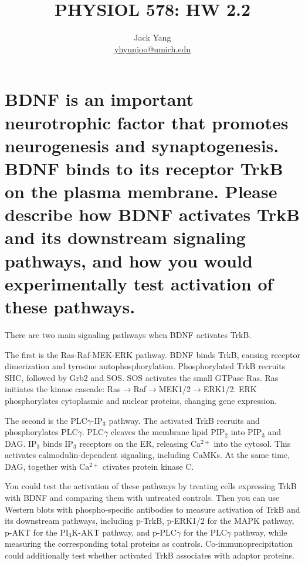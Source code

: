 \documentclass{article}
\title{PHYSIOL 578: HW 2.2\footnotetext{U-M GPT was used to help draft and refine the answers.}}
\author{Jack Yang \\ \href{mailto:yhyunjoo@umich.edu}{yhyunjoo@umich.edu}}
\begin{document}
\maketitle

\section{
    BDNF is an important neurotrophic factor that promotes neurogenesis and synaptogenesis.
    BDNF binds to its receptor TrkB on the plasma membrane.
    Please describe how BDNF activates TrkB and its downstream signaling pathways, and how you would experimentally test activation of these pathways.
}
There are two main signaling pathways when BDNF activates TrkB.

The first is the Ras-Raf-MEK-ERK pathway.
BDNF binds TrkB, causing receptor dimerization and tyrosine autophosphorylation.
Phosphorylated TrkB recruits SHC, followed by Grb2 and SOS.
SOS activates the small GTPase Ras.
Ras initiates the kinase cascade: Ras$\rightarrow$Raf$\rightarrow$MEK1/2$\rightarrow$ERK1/2.
ERK phosphorylates cytoplasmic and nuclear proteins, changing gene expression.

The second is the PLC$\gamma$-IP$_3$ pathway.
The activated TrkB recruits and phosphorylates PLC$\gamma$.
PLC$\gamma$ cleaves the membrane lipid PIP$_2$ into PIP$_3$ and DAG.
IP$_3$ binds IP$_3$ receptors on the ER, releasing Ca$^{2+}$ into the cytosol.
This activates calmodulin-dependent signaling, including CaMKs.
At the same time, DAG, together with Ca$^{2+}$ ctivates protein kinase C.

You could test the activation of these pathways by treating cells expressing TrkB with BDNF and comparing them with untreated controls.
Then you can use Western blots with phospho-specific antibodies to measure activation of TrkB and its downstream pathways, including p-TrkB, p-ERK1/2 for the MAPK pathway, p-AKT for the PI$_3$K-AKT pathway, and p-PLC$\gamma$ for the PLC$\gamma$ pathway, while measuring the corresponding total proteins as controls.
Co-immunoprecipitation could additionally test whether activated TrkB associates with adaptor proteins.
\end{document}
